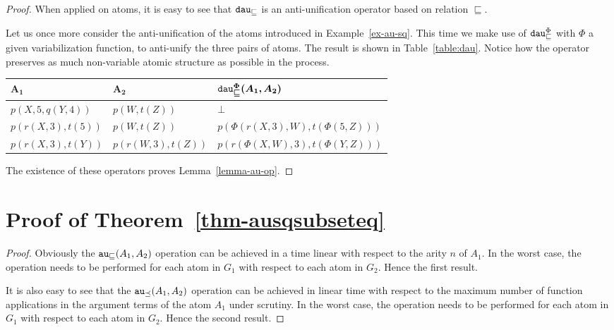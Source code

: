 \begin{proof}
When applied on atoms, it is easy to see that $\texttt{dau}_\sqsubseteq$ is an anti-unification operator based on relation $\sqsubseteq$.

\begin{example}
	Let us once more consider the anti-unification of the atoms introduced in Example~\ref{ex-au-sq}. This time we make use of $\texttt{dau}_\sqsubseteq^\Phi$ with $\Phi$ a given variabilization function, to anti-unify the three pairs of atoms. The result is shown in Table~\ref{table:dau}. Notice how the operator preserves as much non-variable atomic structure as possible in the process.
\end{example}
\begin{table*}
	\caption{Example results for $dau_\sqsubseteq^\Phi$}
	\label{table:dau}
	\centering
	\begin{tabular}{l|l|l}
		$\bm{A_1}$ & $\bm{A_2}$ & $\bm{\texttt{dau}_\sqsubseteq^\Phi(A_1, A_2)}$\\\hline 
		$p(X, 5, q(Y,4))$ & $p(W,t(Z))$ & $\bot$\\\hline 
		$p(r(X,3), t(5))$ & $p(W, t(Z))$ & $p(\Phi(r(X,3),W),t(\Phi(5,Z)))$\\\hline 
		$p(r(X,3), t(Y))$ & $p(r(W,3),t(Z))$ & $p(r(\Phi(X,W),3), t(\Phi(Y,Z)))$ %
	\end{tabular} 
\end{table*}
The existence of these operators proves Lemma~\ref{lemma-au-op}.
	\end{proof}
	
	\section{Proof of Theorem~\ref{thm-ausqsubseteq}}
	\begin{proof}
	Obviously the $\texttt{au}_\sqsubseteq(A_1,A_2)$ operation can be achieved in a time linear with respect to the arity $n$ of $A_1$. In the worst case, the operation needs to be performed for each atom in $G_1$ with respect to each atom in $G_2$. Hence the first result.
	
	
	It is also easy to see that the $\texttt{au}_\preceq(A_1,A_2)$ operation can be achieved in linear time with respect to the maximum number of function applications in the argument terms of the atom $A_1$ under scrutiny. In the worst case, the operation needs to be performed for each atom in $G_1$ with respect to each atom in $G_2$. Hence the second result.
	\end{proof}
		

